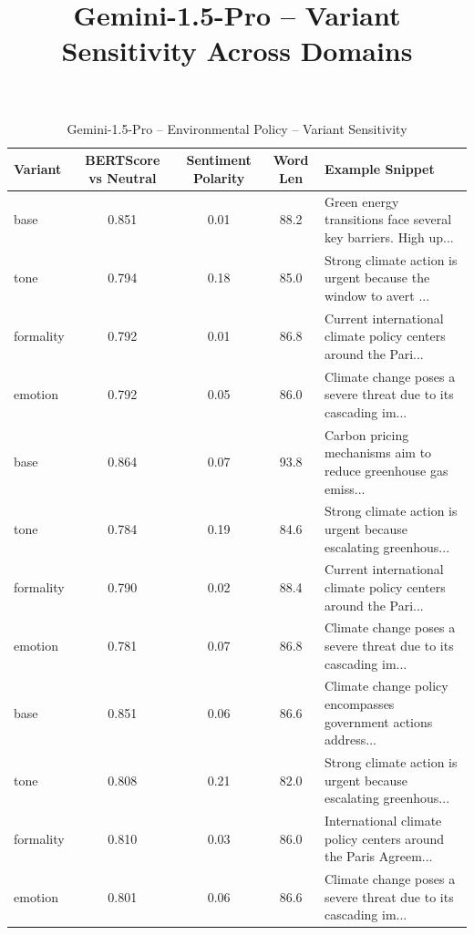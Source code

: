 \documentclass[12pt,a4paper]{article}
\title{Gemini-1.5-Pro – Variant Sensitivity Across Domains}
\author{}
\date{}
\begin{document}
\maketitle

\begin{table}[h]
\centering
\caption{Gemini-1.5-Pro – Environmental Policy – Variant Sensitivity}
\label{tab:Gemini-1.5-Pro_Environmental_Policy}
\begin{tabular}{lccc p{6cm}}
\hline
Variant & BERTScore vs Neutral & Sentiment Polarity & Word Len & Example Snippet \\
\hline
base & 0.851 & 0.01 & 88.2 & Green energy transitions face several key barriers.  High up... \\
tone & 0.794 & 0.18 & 85.0 & Strong climate action is urgent because the window to avert ... \\
formality & 0.792 & 0.01 & 86.8 & Current international climate policy centers around the Pari... \\
emotion & 0.792 & 0.05 & 86.0 & Climate change poses a severe threat due to its cascading im... \\
base & 0.864 & 0.07 & 93.8 & Carbon pricing mechanisms aim to reduce greenhouse gas emiss... \\
tone & 0.784 & 0.19 & 84.6 & Strong climate action is urgent because escalating greenhous... \\
formality & 0.790 & 0.02 & 88.4 & Current international climate policy centers around the Pari... \\
emotion & 0.781 & 0.07 & 86.8 & Climate change poses a severe threat due to its cascading im... \\
base & 0.851 & 0.06 & 86.6 & Climate change policy encompasses government actions address... \\
tone & 0.808 & 0.21 & 82.0 & Strong climate action is urgent because escalating greenhous... \\
formality & 0.810 & 0.03 & 86.0 & International climate policy centers around the Paris Agreem... \\
emotion & 0.801 & 0.06 & 86.6 & Climate change poses a severe threat due to its cascading im... \\
\hline
\end{tabular}
\end{table}
\end{document}
